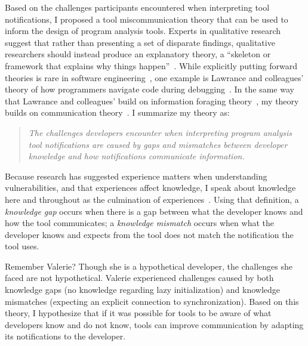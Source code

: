 \documentclass{llncs}
\begin{document}
Based on the challenges participants encountered when interpreting tool notifications, I proposed a tool miscommunication theory that can be used to inform the design of program analysis tools.
Experts in qualitative research suggest that rather than presenting a set of disparate findings, qualitative researchers should instead produce an explanatory theory, a ``skeleton or framework that explains why things happen''~\cite{corbin2014basics}. While explicitly putting forward theories is rare in software engineering~\cite{hannay2007systematic}, one example is Lawrance and colleagues' theory of how programmers navigate code during debugging~\cite{lawrance2013programmers}. In the same way that Lawrance and colleagues' build on 
information foraging theory~\cite{pirolli1999information}, my theory builds on communication theory~\cite{bowman1987modeling}.
I summarize my theory as:

\begin{quotation}
	\noindent
	\emph{The challenges developers encounter when interpreting program analysis tool notifications are caused by gaps and mismatches between developer knowledge and how notifications communicate information.}
\end{quotation}

Because research has suggested experience matters when understanding vulnerabilities, and that experiences affect knowledge, I speak about knowledge here and throughout as the culmination of experiences~\cite{johnson1989mental,argote2011organizational,baca2009static}.
Using that definition, a \emph{knowledge gap} occurs when there is a gap between what the developer knows and how the tool communicates; a \emph{knowledge mismatch} occurs when what the developer knows and expects from the tool does not match the notification the tool uses.

Remember Valerie? Though she is a hypothetical developer, the challenges she faced are not hypothetical. Valerie experienced challenges caused by both knowledge gaps (no knowledge regarding lazy initialization) and knowledge mismatches (expecting an explicit connection to synchronization). Based on this theory, I hypothesize that if it was possible for tools to be aware of what developers know and do not know, tools can improve communication by adapting its notifications to the developer.
\end{document}
